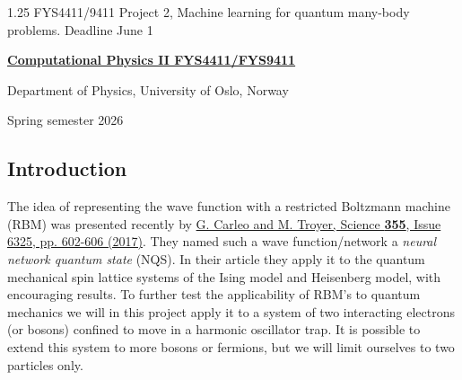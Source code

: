 \documentclass[%
oneside,                 %
final,                   %
10pt]{article}
\begin{document}

\newcommand{\exercisesection}[1]{\subsection*{#1}}






\thispagestyle{empty}

\begin{center}
{\LARGE\bf
\begin{spacing}{1.25}
FYS4411/9411 Project 2, Machine learning for  quantum many-body problems. Deadline June 1
\end{spacing}
}
\end{center}


\begin{center}
{\bf \href{{http://www.uio.no/studier/emner/matnat/fys/FYS4411/index-eng.html}}{Computational Physics II FYS4411/FYS9411}}
\end{center}

    \begin{center}
\centerline{{\small Department of Physics, University of Oslo, Norway}}
\end{center}
    

\begin{center}
Spring semester 2026
\end{center}

\vspace{1cm}


\subsection{Introduction}

The idea of representing the wave function with
a restricted Boltzmann machine (RBM) was presented recently by \href{{http://science.sciencemag.org/content/355/6325/602}}{G. Carleo and M. Troyer, Science \textbf{355}, Issue 6325, pp. 602-606 (2017)}. They
named such a wave function/network a \textit{neural network quantum
state} (NQS). In their article they apply it to the quantum mechanical
spin lattice systems of the Ising model and Heisenberg model, with
encouraging results. To further test the applicability of RBM's to
quantum mechanics we will in this project apply it to a system of
two interacting electrons (or bosons)  confined to move in a harmonic oscillator trap.
It is possible to extend this system to more bosons or fermions, but we will limit ourselves to two particles only.
\end{document}
